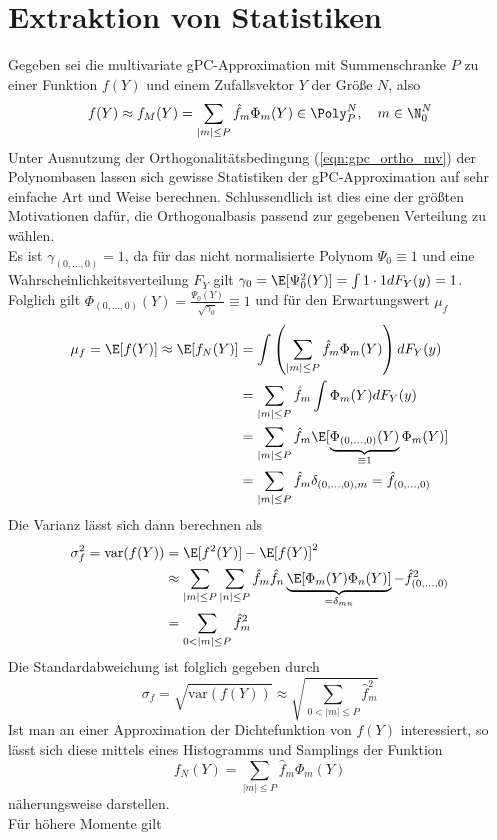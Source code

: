 \section{Extraktion von Statistiken}
Gegeben sei die multivariate gPC-Approximation mit Summenschranke $P$ zu einer Funktion $f(Y)$ und einem Zufallsvektor $Y$ der Größe $N$, also
\[f(Y)\approx f_M(Y)=\sum_{|m|\le P}\hat{f}_m\Phi_m(Y)\in\Poly_P^N,\quad m\in\N_0^N\]
Unter Ausnutzung der Orthogonalitätsbedingung (\ref{eqn:gpc_ortho_mv}) der Polynombasen lassen sich gewisse Statistiken der gPC-Approximation auf sehr einfache Art und Weise berechnen. Schlussendlich ist dies eine der größten Motivationen dafür, die Orthogonalbasis passend zur gegebenen Verteilung zu wählen.\\
Es ist $\gamma_{(0,\dots,0)}=1$, da für das nicht normalisierte Polynom $\Psi_0\equiv 1$ und eine Wahrscheinlichkeitsverteilung $F_Y$ gilt $\gamma_0=\E[\Psi_0^2(Y)]=\int 1\cdot 1dF_Y(y)=1$. Folglich gilt $\Phi_{(0,\dots,0)}(Y)= \frac{\Psi_0(Y)}{\sqrt{\gamma_0}}\equiv 1$ und für den Erwartungswert $\mu_f$
\begin{equation}
\label{eqn:gpc_approx_exp}
\begin{split}
\mu_f=\E[f(Y)]\approx \E[f_N(Y)]&=\int\left(\sum_{|m|\le P}\hat{f}_m\Phi_m(Y)\right)dF_Y(y)\\
&=\sum_{|m|\le P}\hat{f}_m\int\Phi_m(Y)dF_Y(y)\\
&=\sum_{|m|\le P}\hat{f}_m\E[\underbrace{\Phi_{(0,\dots,0)}(Y)}_{\equiv 1} \Phi_m(Y)]\\
&=\sum_{|m|\le P}\hat{f}_m\delta_{(0,\dots,0),m}=\hat{f}_{(0,\dots,0)}
\end{split}
\end{equation}
Die Varianz lässt sich dann berechnen als
\begin{align*}
\sigma^2_f=\text{var}(f(Y))&=\E[f^2(Y)]-\E[f(Y)]^2\\
&\approx \sum_{|m|\le P}\sum_{|n|\le P}\hat{f}_m\hat{f}_n\underbrace{\E[\Phi_m(Y)\Phi_n(Y)]}_{=\delta_{mn}}-\hat{f}_{(0,\dots,0)}^2\\
&=\sum_{0<|m|\le P}\hat{f}_m^2
\end{align*}
Die Standardabweichung ist folglich gegeben durch
\[\sigma_f=\sqrt{\text{var}(f(Y))}\approx\sqrt{\sum_{0<|m|\le P}\hat{f}_m^2}\]
Ist man an einer Approximation der Dichtefunktion von $f(Y)$ interessiert, so lässt sich diese mittels eines Histogramms und Samplings der Funktion 
\[f_N(Y)=\sum_{|m|\le P}\hat{f}_m\Phi_m(Y)\]
näherungsweise darstellen.\\[0.2cm]
Für höhere Momente gilt
